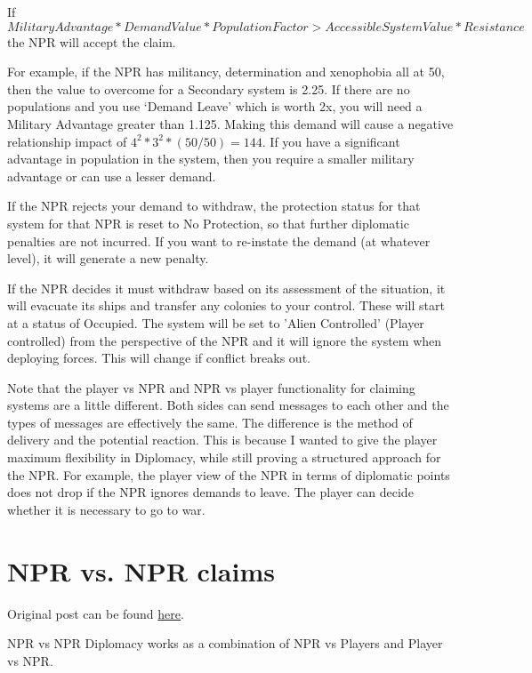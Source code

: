 \documentclass[10pt,a4paper,oneside]{article}
\begin{document}
If
\[ Military Advantage * Demand Value * Population Factor > Accessible System Value * Resistance \]
the NPR will accept the claim.

For example, if the NPR has militancy, determination and xenophobia all at 50, then the value to overcome for a Secondary system is 2.25. If there are no populations and you use ‘Demand Leave’ which is worth 2x, you will need a Military Advantage greater than 1.125. Making this demand will cause a negative relationship impact of \( 4^{2} * 3^{2} * (50/50) = 144 \). If you have a significant advantage in population in the system, then you require a smaller military advantage or can use a lesser demand.

If the NPR rejects your demand to withdraw, the protection status for that system for that NPR is reset to No Protection, so that further diplomatic penalties are not incurred. If you want to re-instate the demand (at whatever level), it will generate a new penalty.

If the NPR decides it must withdraw based on its assessment of the situation, it will evacuate its ships and transfer any colonies to your control. These will start at a status of Occupied. The system will be set to 'Alien Controlled' (Player controlled) from the perspective of the NPR and it will ignore the system when deploying forces. This will change if conflict breaks out.

Note that the player vs NPR and NPR vs player functionality for claiming systems are a little different. Both sides can send messages to each other and the types of messages are effectively the same. The difference is the method of delivery and the potential reaction. This is because I wanted to give the player maximum flexibility in Diplomacy, while still proving a structured approach for the NPR. For example, the player view of the NPR in terms of diplomatic points does not drop if the NPR ignores demands to leave. The player can decide whether it is necessary to go to war.

\section{NPR vs. NPR claims}\label{4_npr_vs_npr_claims}
Original post can be found
\href{http://aurora2.pentarch.org/index.php?topic=8495.msg118398#msg118398}{here}.
\newline\newline

NPR vs NPR Diplomacy works as a combination of NPR vs Players and Player vs NPR.
\end{document}
